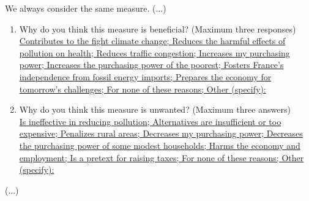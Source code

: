 \documentclass[english,5p,authoryear]{elsarticle}
\begin{document}
\begin{appendices}
We always consider the same measure. (...)
\begin{enumerate}[resume,leftmargin=*]
\item Why do you think this measure is beneficial? (Maximum three responses)
\uline{}\\
\uline{Contributes to the fight climate change; Reduces the harmful
effects of pollution on health; Reduces traffic congestion; Increases
my purchasing power; Increases the purchasing power of the poorest;
Fosters France's independence from fossil energy imports; Prepares
the economy for tomorrow's challenges; For none of these reasons;
Other (specify): }
\item Why do you think this measure is unwanted? (Maximum three answers)
\uline{}\\
\uline{Is ineffective in reducing pollution; Alternatives are insufficient
or too expensive; Penalizes rural areas; Decreases my purchasing power;
Decreases the purchasing power of some modest households; Harms the
economy and employment; Is a pretext for raising taxes; For none of
these reasons; Other (specify):} 
\end{enumerate}
(...)


\end{appendices}
\end{document}
